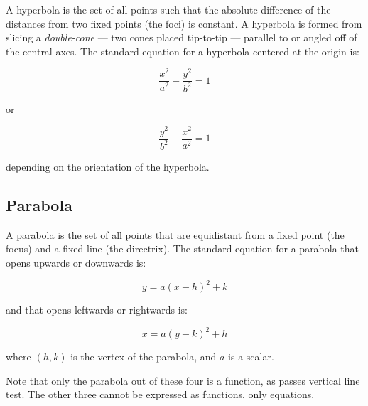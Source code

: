 A hyperbola is the set of all points such that the absolute difference
of the distances from two fixed points (the foci) is constant. A hyperbola is formed from slicing a \emph{double-cone} --- two cones placed tip-to-tip --- parallel to or angled off of the central axes.  The
standard equation for a hyperbola centered at the origin is:

\begin{equation}
\frac{x^2}{a^2} - \frac{y^2}{b^2} = 1
\end{equation}

or

\begin{equation}
\frac{y^2}{b^2} - \frac{x^2}{a^2} = 1
\end{equation}

depending on the orientation of the hyperbola.



\subsection{Parabola}

A parabola is the set of all points that are equidistant from a fixed
point (the focus) and a fixed line (the directrix). The standard
equation for a parabola that opens upwards or downwards is:

\begin{equation}
y = a(x - h)^2 + k
\end{equation}

and that opens leftwards or rightwards is:

\begin{equation}
x = a(y - k)^2 + h
\end{equation}

\begin{center}
  
\end{center}


where $(h,k)$ is the vertex of the parabola, and $a$ is a scalar.

Note that only the parabola out of these four is a function, as passes vertical line test. The other three cannot be expressed as functions, only equations.
